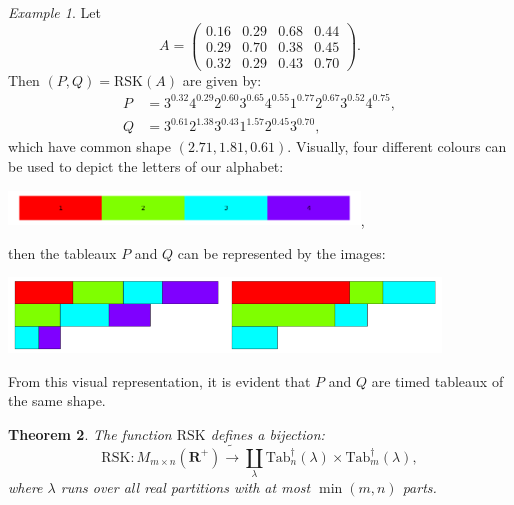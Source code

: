 \documentclass[10pt]{amsproc}
\newtheorem{theorem}{Theorem}[subsection]
\theoremstyle{definition}
\theoremstyle{remark}
\newtheorem{example}[theorem]{Example}
\newcommand{\ttab}{\mathrm{Tab}^\dagger}
\newcommand{\rp}{\mathbf{R}^+}
\newcommand{\rsk}{\mathrm{RSK}}
\begin{document}
\begin{example}
  Let
  \begin{displaymath}
    A = 
    \begin{pmatrix}
      0.16 & 0.29 & 0.68 & 0.44\\ 
      0.29 & 0.70 & 0.38 & 0.45\\ 
      0.32 & 0.29 & 0.43 & 0.70
    \end{pmatrix}.
  \end{displaymath}
  Then $(P, Q) = \rsk(A)$ are given by:
  \begin{align*}
    P & = 3^{0.32}4^{0.29}2^{0.60}3^{0.65}4^{0.55}1^{0.77}2^{0.67}3^{0.52}4^{0.75},\\
    Q & = 3^{0.61}2^{1.38}3^{0.43}1^{1.57}2^{0.45}3^{0.70},
  \end{align*}
  which have common shape $(2.71,1.81,0.61)$.
  Visually, four different colours can be used to depict the letters of our alphabet:
  \begin{center}
    \includegraphics[width=0.7\textwidth]{color_legend.png},
  \end{center}
  then the tableaux $P$ and $Q$ can be represented by the images:
  \begin{center}
    \includegraphics[height=2cm]{pplot.png}\hspace{1cm}\includegraphics[height=2cm]{qplot.png}
  \end{center}
  From this visual representation, it is evident that $P$ and $Q$ are timed tableaux of the same shape.
\end{example}
\begin{theorem}
  \label{theorem:rsk}
  The function $\rsk$ defines a bijection:
  \begin{displaymath}
    \rsk: M_{m\times n}(\rp)\tilde\to \coprod_\lambda \ttab_n(\lambda)\times\ttab_m(\lambda),
  \end{displaymath}
  where $\lambda$ runs over all real partitions with at most $\min(m,n)$ parts.
\end{theorem}
\end{document}
